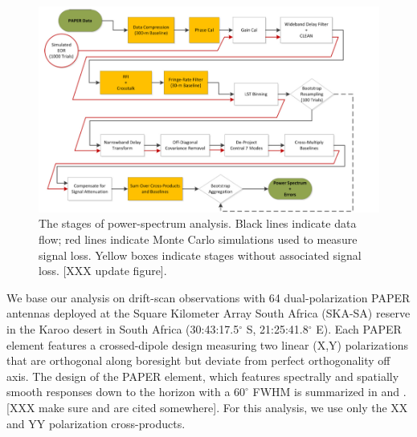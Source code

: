 \documentclass[twocolumn,numberedappendix]{emulateapj} \shorttitle{PSA64}
\begin{document}
\begin{figure}[!t]
\includegraphics[width=2\columnwidth,height=\columnwidth]{plots/data_flow_chart.png}
\caption
{
The stages of power-spectrum analysis. Black lines indicate data flow; red lines indicate
Monte Carlo simulations used to 
measure signal loss. Yellow boxes indicate stages without associated signal loss.
[XXX update figure].
}
\label{fig:flowchart}
\end{figure}

We base our analysis on drift-scan observations 
with 64 dual-polarization PAPER antennas deployed 
at the Square Kilometer Array South Africa
(SKA-SA) reserve in the Karoo desert in South Africa
(30:43:17.5$^\circ$ S, 21:25:41.8$^\circ$ E).
Each PAPER element features a crossed-dipole design measuring two
linear (X,Y) polarizations that are orthogonal along boresight but deviate
from perfect orthogonality off axis.  The design of the PAPER element, 
which features spectrally and spatially smooth responses 
down to the horizon with a $60^{\circ}$ FWHM is summarized in \citet{parsons_et_al2010}
and \citet{pober_et_al2012}.  
[XXX make sure \cite{jacobs_et_al2011} and \cite{stefan_et_al2013} are cited somewhere].
For this analysis, we use only the XX and YY polarization cross-products.
\end{document}
